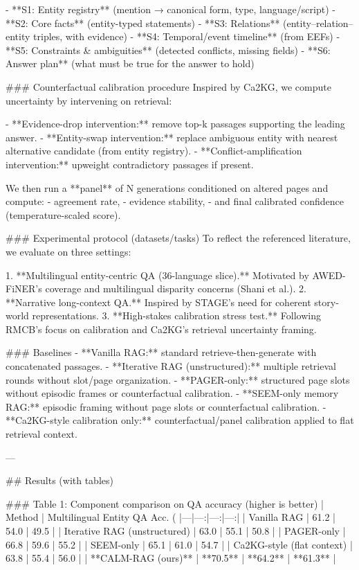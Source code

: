 - **S1: Entity registry** (mention → canonical form, type, language/script)
- **S2: Core facts** (entity-typed statements)
- **S3: Relations** (entity–relation–entity triples, with evidence)
- **S4: Temporal/event timeline** (from EEFs)
- **S5: Constraints & ambiguities** (detected conflicts, missing fields)
- **S6: Answer plan** (what must be true for the answer to hold)

### Counterfactual calibration procedure  
Inspired by Ca2KG, we compute uncertainty by intervening on retrieval:

- **Evidence-drop intervention:** remove top-k passages supporting the leading answer.
- **Entity-swap intervention:** replace ambiguous entity with nearest alternative candidate (from entity registry).
- **Conflict-amplification intervention:** upweight contradictory passages if present.

We then run a **panel** of N generations conditioned on altered pages and compute:
- agreement rate,
- evidence stability,
- and final calibrated confidence (temperature-scaled score).

### Experimental protocol (datasets/tasks)  
To reflect the referenced literature, we evaluate on three settings:

1. **Multilingual entity-centric QA (36-language slice).** Motivated by AWED-FiNER’s coverage and multilingual disparity concerns (Shani et al.).  
2. **Narrative long-context QA.** Inspired by STAGE’s need for coherent story-world representations.  
3. **High-stakes calibration stress test.** Following RMCB’s focus on calibration and Ca2KG’s retrieval uncertainty framing.

### Baselines  
- **Vanilla RAG:** standard retrieve-then-generate with concatenated passages.
- **Iterative RAG (unstructured):** multiple retrieval rounds without slot/page organization.
- **PAGER-only:** structured page slots without episodic frames or counterfactual calibration.
- **SEEM-only memory RAG:** episodic framing without page slots or counterfactual calibration.
- **Ca2KG-style calibration only:** counterfactual/panel calibration applied to flat retrieval context.

---

## Results (with tables)

### Table 1: Component comparison on QA accuracy (higher is better)  
| Method | Multilingual Entity QA Acc. (%
|---|---:|---:|---:|
| Vanilla RAG | 61.2 | 54.0 | 49.5 |
| Iterative RAG (unstructured) | 63.0 | 55.1 | 50.8 |
| PAGER-only | 66.8 | 59.6 | 55.2 |
| SEEM-only | 65.1 | 61.0 | 54.7 |
| Ca2KG-style (flat context) | 63.8 | 55.4 | 56.0 |
| **CALM-RAG (ours)** | **70.5** | **64.2** | **61.3** |

